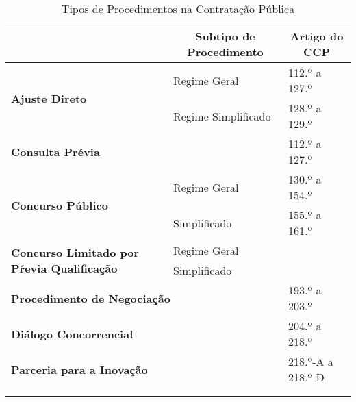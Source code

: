 \begin{table}[h!]
	\centering
	\begin{tabular}{|l|l|l|} 
		\hline
		\rowcolor[HTML]{B1DEFF}  \multicolumn{1}{|c|}{\textbf{Tipo de Procedimento~ ~}} & \multicolumn{1}{c|}{\textbf{Subtipo de Procedimento}} & \multicolumn{1}{c|}{\textbf{Artigo do CCP}}  \\ 
		\hline
		\multirow{2}{*}{\textbf{Ajuste Direto}}                                             & Regime Geral                                          & 112.º a 127.º                                \\ 
		\cline{2-3}
		& Regime Simplificado                                   & 128.º a 129.º                                \\ 
		\hline
		\multicolumn{2}{|l|}{\textbf{Consulta Prévia}}                                                                                              & 112.º a 127.º                                \\ 
		\hline
		\multirow{2}{*}{\textbf{Concurso Público}}                                          & Regime Geral                                          & 130.º a 154.º                                \\ 
		\cline{2-3}
		& Simplificado                                          & 155.º a 161.º                                \\ 
		\hline
		\multirow{2}{*}{\textbf{Concurso Limitado por Pŕevia Qualificação~ ~}}              & Regime Geral                                          &                                              \\ 
		\cline{2-3}
		& Simplificado                                          &                                              \\ 
		\hline
		\multicolumn{2}{|l|}{\textbf{Procedimento de Negociação}}                                                                                   & 193.º a 203.º                                \\ 
		\hline
		\multicolumn{2}{|l|}{\textbf{Diálogo Concorrencial }}                                                                                       & 204.º a 218.º                                \\ 
		\hline
		\multicolumn{2}{|l|}{\textbf{Parceria para a Inovação }}                                                                                    & 218.º-A a 218.º-D                            \\ 
		\hline
		\multicolumn{1}{l}{}                                                                & \multicolumn{1}{l}{}                                  & \multicolumn{1}{l}{}                         \\
		\multicolumn{1}{l}{}                                                                & \multicolumn{1}{l}{}                                  & \multicolumn{1}{l}{}                        
	\end{tabular}
	\caption{Tipos de Procedimentos na Contratação Pública}
	\label{}
\end{table}


